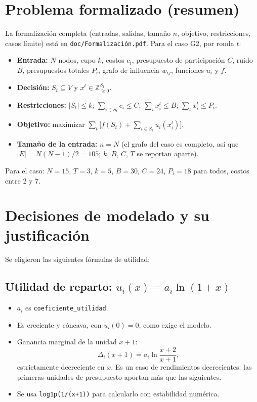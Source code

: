\documentclass[11pt,a4paper]{article}
\newcommand{\Z}{\mathbb{Z}}
\begin{document}
\section{Problema formalizado (resumen)}

La formalización completa (entradas, salidas, tamaño $n$, objetivo,
restricciones, casos límite) está en \texttt{doc/Formalización.pdf}. Para el
caso G2, por ronda $t$:

\begin{itemize}[leftmargin=*,label=$\bullet$]
  \item \textbf{Entrada:} $N$ nodos, cupo $k$, costos $c_i$, presupuesto de
  participación $C$, ruido $B$, presupuestos totales $P_i$, grafo de influencia
  $w_{ij}$, funciones $u_i$ y $f$.
  \item \textbf{Decisión:} $S_t\subseteq V$ y
  $x^t\in\Z_{\ge0}^{S_t}$.
  \item \textbf{Restricciones:} $|S_t|\le k$;
  $\sum_{i\in S_t} c_i\le C$; $\sum_i x_i^t\le B$;
  $\sum_t x_i^t\le P_i$.
  \item \textbf{Objetivo:} maximizar
  $\sum_t\bigl[f(S_t)+\sum_{i\in S_t}u_i(x_i^t)\bigr]$.
  \item \textbf{Tamaño de la entrada:} $n=N$ (el grafo del caso es completo,
  así que $|E|=N(N-1)/2=105$; $k$, $B$, $C$, $T$ se reportan aparte).
\end{itemize}

Para el caso: $N=15$, $T=3$, $k=5$, $B=30$, $C=24$, $P_i=18$ para todos,
costos entre 2 y 7.

\section{Decisiones de modelado y su justificación}

Se eligieron las siguientes fórmulas de utilidad:

\subsection{Utilidad de reparto: $u_i(x)=a_i\ln(1+x)$}

\begin{itemize}[leftmargin=*,label=$\bullet$]
  \item $a_i$ es \texttt{coeficiente\_utilidad}.
  \item Es creciente y cóncava, con $u_i(0)=0$, como exige el modelo.
  \item Ganancia marginal de la unidad $x+1$:
  \[
    \Delta_i(x+1)=a_i\ln\frac{x+2}{x+1},
  \]
  estrictamente decreciente en $x$. Es un caso de rendimientos decrecientes:
  las primeras unidades de presupuesto aportan más que las siguientes.
  \item Se usa \texttt{log1p(1/(x+1))} para calcularlo con estabilidad numérica.
\end{itemize}
\end{document}
